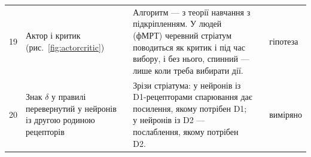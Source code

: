 {\begin{longtable}{>{\raggedright}p{0.5cm}>{\raggedright}p{4.0cm}>{\raggedright}p{5.6cm}>{\raggedright}p{2.3cm}>{\raggedright\arraybackslash}p{1.7cm}}
19 & Актор і критик (рис.~\ref{fig:actorcritic}) & Алгоритм --- з теорії навчання з підкріпленням. У людей (фМРТ) черевний стріатум поводиться як критик і під час вибору, і без нього, спинний --- лише коли треба вибирати дії. & \cite{SuttonBarto2018, ODoherty2004actor} & гіпотеза \\
20 & Знак $\delta$ у правилі перевернутий у нейронів із другою родиною рецепторів & Зрізи стріатума: у нейронів із D1-рецепторами спарювання дає посилення, якому потрібен D1; у нейронів із D2 --- послаблення, якому потрібен D2. & \cite{Shen2008} & виміряно \\
\bottomrule
\end{longtable}}

